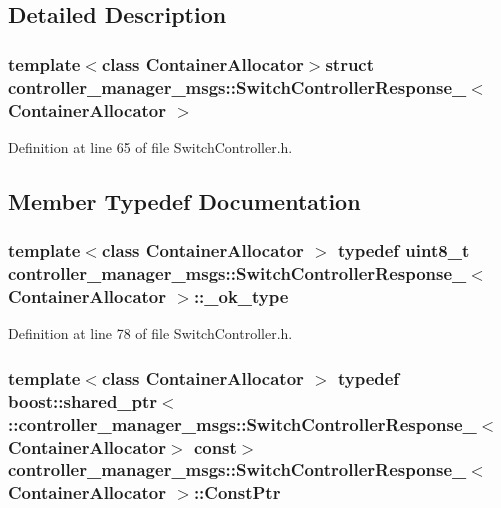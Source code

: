 \subsection{\-Detailed \-Description}
\subsubsection*{template$<$class Container\-Allocator$>$struct controller\-\_\-manager\-\_\-msgs\-::\-Switch\-Controller\-Response\-\_\-$<$ Container\-Allocator $>$}



\-Definition at line 65 of file \-Switch\-Controller.\-h.



\subsection{\-Member \-Typedef \-Documentation}
\subsubsection[{\-\_\-ok\-\_\-type}]{\setlength{\rightskip}{0pt plus 5cm}template$<$class Container\-Allocator $>$ typedef uint8\-\_\-t {\bf controller\-\_\-manager\-\_\-msgs\-::\-Switch\-Controller\-Response\-\_\-}$<$ \-Container\-Allocator $>$\-::{\bf \-\_\-ok\-\_\-type}}\label{structcontroller__manager__msgs_1_1SwitchControllerResponse___a1626b3732047b2ab86a333f27a3ff3a4}


\-Definition at line 78 of file \-Switch\-Controller.\-h.

\subsubsection[{\-Const\-Ptr}]{\setlength{\rightskip}{0pt plus 5cm}template$<$class Container\-Allocator $>$ typedef boost\-::shared\-\_\-ptr$<$ \-::{\bf controller\-\_\-manager\-\_\-msgs\-::\-Switch\-Controller\-Response\-\_\-}$<$\-Container\-Allocator$>$ const$>$ {\bf controller\-\_\-manager\-\_\-msgs\-::\-Switch\-Controller\-Response\-\_\-}$<$ \-Container\-Allocator $>$\-::{\bf \-Const\-Ptr}}\label{structcontroller__manager__msgs_1_1SwitchControllerResponse___aa761fa30a47ecec1462a676bd4b566e2}


